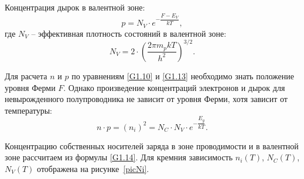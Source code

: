 \documentclass[14pt,a4paper]{extarticle}
\begin{document}
  Концентрация дырок в валентной зоне:
  \begin{equation}
    p = N_V\cdot e^{-\dfrac{F - E_V}{kT}},
    \label{G1.13}
  \end{equation}
  где \( N_V \) -- эффективная плотность состояний в валентной зоне:
  \[
    N_V = 2\cdot\left (\frac{2\pi m_p kT}{h^2} \right)^{3/2}.
  \]

  Для расчета \( n \) и \( p \) по уравнениям \eqref{G1.10} и \eqref{G1.13}
  необходимо знать положение уровня Ферми \( F \). Однако произведение
  концентраций электронов и дырок для невырожденного полупроводника не зависит
  от уровня Ферми, хотя зависит от температуры:
  \begin{equation}
    n\cdot p = (n_i)^2 = N_C\cdot N_V\cdot e^{-\dfrac{E_g}{kT}}.
    \label{G1.14}
  \end{equation}

  Концентрацию собственных носителей заряда в зоне проводимости и в валентной
  зоне рассчитаем из формулы \eqref{G1.14}. Для кремния зависимость
  \( n_i(T) \), \( N_C(T) \), \( N_V(T) \) отображена на рисунке~\ref{picNi}.

  \newpage
\end{document}
